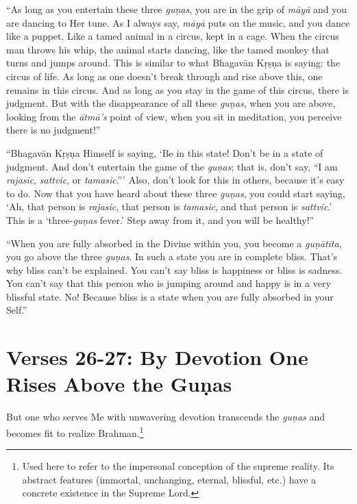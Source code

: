 \enquote{As long as you entertain these three \textit{guṇas}, you are in the grip of \textit{māyā} and you are dancing to Her tune. As I always say, \textit{māyā} puts on the music, and you dance like a puppet. Like a tamed animal in a circus, kept in a cage. When the circus man throws his whip, the animal starts dancing, like the tamed monkey that turns and jumps around. This is similar to what Bhagavān Kṛṣṇa is saying: the circus of life. As long as one doesn’t break through and rise above this, one remains in this circus. And as long as you stay in the game of this circus, there is judgment. But with the disappearance of all these \textit{guṇas}, when you are above, looking from the \textit{ātmā’s} point of view, when you sit in meditation, you perceive there is no judgment!}

\enquote{Bhagavān Kṛṣṇa Himself is saying, \enquote{Be in this state! Don’t be in a state of judgment. And don’t entertain the game of the \textit{guṇas}; that is, don’t say, \enquote{I am \textit{rajasic}, \textit{sattvic}, or \textit{tamasic}.}} Also, don’t look for this in others, because it’s easy to do. Now that you have heard about these three \textit{guṇas}, you could start saying, \enquote{Ah, that person is \textit{rajasic}, that person is \textit{tamasic}, and that person is \textit{sattvic}.} This is a \enquote{three-\textit{guṇas} fever.} Step away from it, and you will be healthy!}

\enquote{When you are fully absorbed in the Divine within you, you become a \textit{guṇātīta}, you go above the three \textit{guṇas}. In such a state you are in complete bliss. That’s why bliss can’t be explained. You can’t say bliss is happiness or bliss is sadness. You can’t say that this person who is jumping around and happy is in a very blissful state. No! Because bliss is a state when you are fully absorbed in your Self.}

\section{Verses 26-27: By Devotion One Rises Above the Guṇas}\label{sec-verses-26-27-by-devotion-one-rises-above-the-gunas}

{But one who serves Me with unwavering devotion transcends the \textit{guṇas} and becomes fit to realize Brahman.\footnote{Used here to refer to the impersonal conception of the supreme reality. Its abstract features (immortal, unchanging, eternal, blissful, etc.) have a concrete existence in the Supreme Lord.}}

